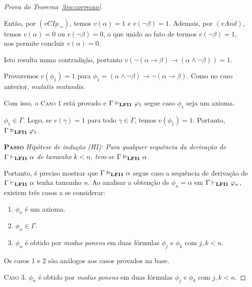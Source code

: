 \begin{proof}[Prova do Teorema~\ref{teo:correcao}]
\begin{provaporcasos}
\begin{provaporsubcasos}
                Então, por $(vCIp_{\to})$, temos $v(\alpha) = 1$ e $v(\neg \beta) = 1$. Ademais, por $(vAnd)$, temos $v(\alpha) = 0$ ou $v(\neg \beta) = 0$, o que unido ao fato de termos $v(\neg \beta) = 1$, nos permite concluir $v(\alpha) = 0$. 
                
                Isto resulta numa contradição, portanto $v(\neg (\alpha \to \beta) \to (\alpha \land \neg \beta)) = 1$.

                \subcasodeprova Provaremos $v(\phi_{1}) = 1$ para $\phi_{1} = (\alpha \land \neg \beta) \to \neg(\alpha \to \beta)$. Como no caso anterior, \textit{mutatis mutandis}.
                
            \end{provaporsubcasos}

            Com isso, o \textsc{Caso 1} está provado e $\Gamma \vDash_{\textbf{LFI1}{}} \varphi_{1}$ segue caso $\phi_{1}$ seja um axioma.

            \casodeprova $\phi_{1} \in \Gamma$. Logo, se $v(\gamma) = 1$ para todo $\gamma \in \Gamma$, temos $v(\phi_{1}) = 1$. Portanto, $\Gamma \vDash_{\textbf{LFI1}{}} \varphi_{1}$.

        \end{provaporcasos}

         \noindent \textbf{\textsc{Passo}} \textit{Hipótese de indução (HI): Para qualquer sequência da derivação de $\Gamma \vdash_{\textbf{LFI1}{}} \alpha$ de tamanho $k < n$, tem-se $\Gamma \vDash_{\textbf{LFI1}{}} \alpha$}. 
         
         Portanto, é preciso mostrar que $\Gamma \vDash_{\textbf{LFI1}{}} \alpha$ segue caso a sequência de derivação de $\Gamma \vdash_{\textbf{LFI1}{}} \alpha$ tenha tamanho $n$. Ao analisar a obtenção de $\phi_{n} = \alpha$ em $\Gamma \vdash_{\textbf{LFI1}{}} \varphi_{n}$, existem três casos a se considerar:
         
         \begin{enumerate}
            \item $\phi_{n}$ é um axioma.
            \item $\phi_{n} \in \Gamma$.
            \item $\phi_{n}$ é obtido por \textit{modus ponens} em duas fórmulas $\phi_{j}$ e $\phi_{k}$ com $j, k < n$. 
         \end{enumerate}
         
         Os casos 1 e 2 são análogos aos casos provados na base.
         
         \noindent \textsc{Caso 3.} $\phi_{n}$ é obtido por \textit{modus ponens} em duas fórmulas $\phi_{j}$ e $\phi_{k}$ com $j, k < n$. 
         

\end{proof}
